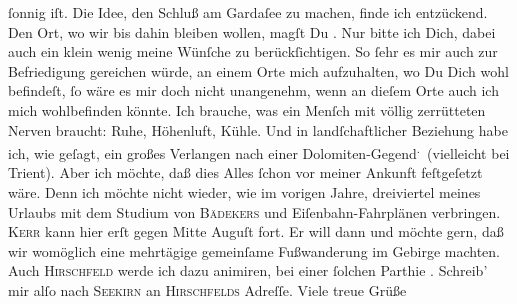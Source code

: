 \begin{ledgroupsized}[t]{13cm}
               ſonnig iſt. Die Idee, den Schluß am Gardaſee zu
               machen, finde ich entzückend. Den Ort, wo wir bis dahin bleiben wollen, magſt Du
                  \label{K_L03073-3v}\label{K_L03073-3h}. Nur bitte ich Dich, dabei auch ein klein wenig meine Wünſche zu
               berückſichtigen. So ſehr {\pb}es mir auch zur Befriedigung
               gereichen würde, an einem Orte mich aufzuhalten, wo Du Dich wohl befindeſt, ſo wäre
               es mir doch nicht \strikeout{\textcolor{gray}{×}} unangenehm, wenn an dieſem Orte auch ich mich wohlbefinden könnte. Ich
               brauche, was ein Menſch mit völlig zerrütteten Nerven braucht: Ruhe, Höhenluft,
               Kühle. Und in landſchaftlicher Beziehung habe ich, wie geſagt, ein großes  Verlangen nach einer Dolomiten-Gegend\substVorne{}\textsuperscript{.}\substDazwischen{} (\substHinten{}vielleicht bei Trient). Aber ich möchte,
               daß dies Alles ſchon vor meiner Ankunft {\pb}feſtgeſetzt
               wäre. Denn ich möchte nicht wieder, wie im vorigen Jahre,
               dreiviertel meines Urlaubs mit dem Studium von \textsc{Bädekers} und Eiſenbahn-Fahrplänen verbringen.\pend
           \pstart
           \textsc{Kerr} kann hier erſt gegen Mitte Auguſt fort. Er will
               dann \label{K_L03073-4v}\label{K_L03073-4h} und möchte gern, daß
               wir womöglich eine mehrtägige gemeinſame Fußwanderung im Gebirge machten. Auch \textsc{Hirschfeld}{ }{\pb}werde ich dazu animiren, bei einer ſolchen Parthie
                  \label{K_L03073-5v}\label{K_L03073-5h}.\pend
           \pstart
           Schreib’ mir alſo nach \textsc{Seekirn} an \textsc{Hirschfelds} Adreſſe. Viele treue Grüße

\end{ledgroupsized}
